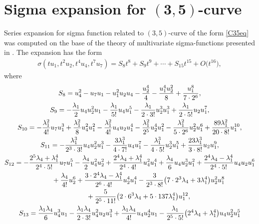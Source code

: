 \documentclass[pdftex]{sigma}
\numberwithin{equation}{section}
\begin{document}
\section[Sigma expansion for $(3,5)$-curve]{Sigma expansion for $\boldsymbol{(3,5)}$-curve}\label{A:TermsC35}
Series expansion for sigma function related to $(3,5)$-curve of the form \eqref{C35eq} was computed on the base of the theory of multivariate sigma-functions presented in \cite{BL2004,BL2008}. The expansion has the form
\begin{gather*}
 \sigma(t u_1,t^2 u_2,t^4 u_4,t^7 u_7) = S_8 t^8 + S_9 t^9 + \cdots + S_{15} t^{15} + O\big(t^{16}\big),
\end{gather*}
where
\begin{gather*}
S_8 = u_4^2- u_7 u_1 - u_1^2 u_2 u_4 -\frac{u_2^4}{4} -\frac{u_1^4 u_2^2}{8} + \frac{u_1^8}{7\cdot 2^6} ,\\
S_9 = -\frac{\lambda_1}{2} u_4 u_2^2 u_1 - \frac{\lambda_1}{5!} u_4 u_1^5 - \frac{\lambda_1}{2\cdot 3!} u_2^3 u_1^3 + \frac{\lambda_1}{2\cdot 5!} u_2 u_1^7,\\
S_{10} =-\frac{\lambda_1^2}{4!} u_7 u_1^3 + \frac{\lambda_1^2}{8} u_4^2 u_1^2 - \frac{\lambda_1^2}{4!} u_4 u_2 u_1^4 - \frac{\lambda_1^2}{2^5} u_2^4 u_1^2 - \frac{\lambda_1^2}{5\cdot 2^6} u_2^2 u_1^6 + \frac{89 \lambda_1^2}{20\cdot 8!} u_1^{10},\\
S_{11} = -\frac{\lambda_1^3}{2^3 \cdot 3!} u_4 u_2^2 u_1^3 - \frac{3\lambda_1^3}{4\cdot 7!} u_4 u_1^7 - \frac{\lambda_1^3}{4\cdot 5!} u_2^3 u_1^5 + \frac{23 \lambda_1^3}{3\cdot 8!} u_2 u_1^9,\\
S_{12} = -\frac{2^5\lambda_4 + \lambda_1^4}{2^4\cdot 5!} u_7 u_1^5 - \frac{\lambda_4}{2} u_4^2 u_2^2 + \frac{2^4 \lambda_4 + \lambda_1^4}{2^4 \cdot 4!} u_4^2 u_1^4 + \frac{\lambda_4}{6} u_4 u_2^3 u_1^2 + \frac{2^4 \lambda_4 - \lambda_1^4}{2^4\cdot 5!} u_4 u_2 u_1^6 \\
\hphantom{S_{12} =}{} + \frac{\lambda_4}{4!} u_2^6 + \frac{3\cdot 2^4 \lambda_4 - \lambda_1^4}{2^6\cdot 4!} u_2^4 u_1^4 -
 \frac{3}{2^3\cdot 8!}\big(7 \cdot 2^3 \lambda_4 + 3 \lambda_1^4\big) u_2^2 u_1^8\\
\hphantom{S_{12} =}{} + \frac{5}{2^5\cdot 11!} \big(2 \cdot 6^3 \lambda_4 + 5 \cdot 137 \lambda_1^4\big) u_1^{12},\\
S_{13} = \frac{\lambda_1\lambda_4}{6} u_4^3 u_1 - \frac{\lambda_1\lambda_4}{2\cdot 3!} u_4^2 u_2 u_1^3
 + \frac{\lambda_1\lambda_4}{4!} u_4 u_2^4 u_1 - \frac{\lambda_1}{2^5 \cdot 5!} \big(2^4 \lambda_4 + \lambda_1^4\big) u_4 u_2^2 u_1^5\\

\end{gather*}
\end{document}

